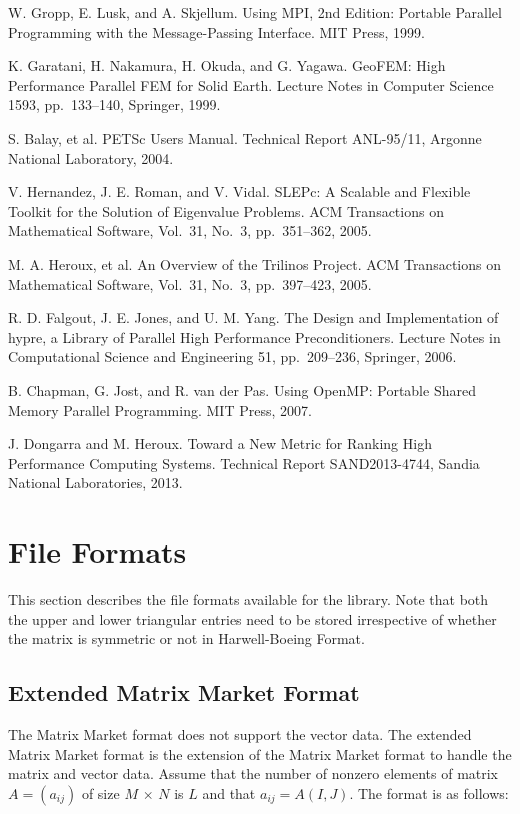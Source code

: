 \documentclass[a4paper]{article}
\begin{document}
\begin{thebibliography}{10}
W. Gropp, E. Lusk, and A. Skjellum.
\newblock Using MPI, 2nd Edition: Portable Parallel Programming with the
	Message-Passing Interface.
\newblock MIT Press, 1999.

K. Garatani, H. Nakamura, H. Okuda, and G. Yagawa.
\newblock GeoFEM: High Performance Parallel FEM for Solid Earth.
\newblock Lecture Notes in Computer Science 1593, pp.\ 133--140, Springer, 1999.

S. Balay, et al.
\newblock PETSc Users Manual.
\newblock Technical Report ANL-95/11, Argonne National Laboratory, 2004.

V. Hernandez, J. E. Roman, and V. Vidal.
\newblock SLEPc: A Scalable and Flexible Toolkit for the Solution of
	Eigenvalue Problems.
\newblock ACM Transactions on Mathematical Software,  Vol.~31, No.~3, pp.\ 351--362, 2005.

M. A. Heroux, et al.
\newblock An Overview of the Trilinos Project.
\newblock ACM Transactions on Mathematical Software,  Vol.~31, No.~3, pp.\ 397--423, 2005.

R. D. Falgout, J. E. Jones, and U. M. Yang.
\newblock The Design and Implementation of hypre, a Library of Parallel
	High Performance Preconditioners.
\newblock Lecture Notes in Computational Science and Engineering 51, pp.\ 209--236, Springer, 2006.

B. Chapman, G. Jost, and R. van der Pas.
\newblock Using OpenMP: Portable Shared Memory Parallel Programming.
\newblock MIT Press, 2007.

J. Dongarra and M. Heroux.
\newblock Toward a New Metric for Ranking High Performance Computing Systems.
\newblock Technical Report SAND2013-4744, Sandia National Laboratories, 2013.

\end{thebibliography}

\newpage
\appendix
\section{File Formats}
\label{sec:matinp}
This section describes the file formats available for the library.
Note that both the upper and lower triangular entries need to be stored
irrespective of whether the matrix is symmetric or not in Harwell-Boeing Format. 

\subsection{Extended Matrix Market Format}
The Matrix Market format does not support 
the vector data. The extended Matrix Market format is the extension of
the Matrix Market format to handle 
the matrix and vector data. Assume that the number of nonzero elements of
matrix $A=(a_{ij})$ of size $M$ $\times$ $N$ is $L$ and 
that $a_{ij} = A(I,J)$. The format is as follows: 
\end{document}
